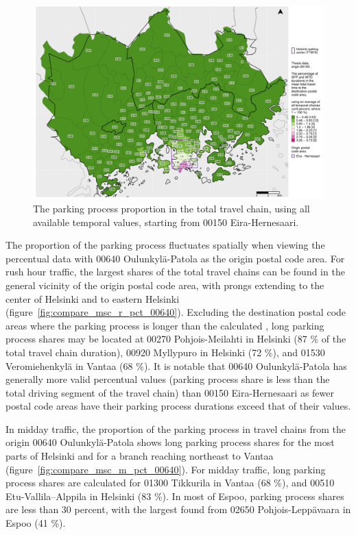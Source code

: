 \begin{figure}[H]%
    \centering
    \includegraphics[trim={0.9cm 0.3cm 0.25cm 0.3cm},clip,width=\textwidth]{images/compare_traveltimes_mapfill-msc_all_pct_fromzip-00150_28-09-2020.png}
    \caption[Parking process proportion from Eira-Hernesaari, all temporal values]{The parking process proportion in the total travel chain, using all available temporal values, starting from 00150 Eira-Hernesaari.}%
    \label{fig:compare_msc_all_pct_00150}%
\end{figure}

The proportion of the parking process fluctuates spatially when viewing the percentual data with 00640 Oulunkylä-Patola as the origin postal code area. For rush hour traffic, the largest shares of the total travel chains can be found in the general vicinity of the origin postal code area, with prongs extending to the center of Helsinki and to eastern Helsinki (figure~\ref{fig:compare_msc_r_pct_00640}). Excluding the destination postal code areas where the parking process is longer than the calculated , long parking process shares may be located at 00270 Pohjois-Meilahti in Helsinki (87 \% of the total travel chain duration), 00920 Myllypuro in Helsinki (72 \%), and 01530 Veromiehenkylä in Vantaa (68 \%). It is notable that 00640 Oulunkylä-Patola has generally more valid percentual values (parking process share is less than the total driving segment of the travel chain) than 00150 Eira-Hernesaari as fewer postal code areas have their parking process durations exceed that of their  values.

In midday traffic, the proportion of the parking process in travel chains from the origin 00640 Oulunkylä-Patola shows long parking process shares for the most parts of Helsinki and for a branch reaching northeast to Vantaa (figure~\ref{fig:compare_msc_m_pct_00640}). For midday traffic, long parking process shares are calculated for 01300 Tikkurila in Vantaa (68 \%), and 00510 Etu-Vallila--Alppila in Helsinki (83 \%). In most of Espoo, parking process shares are less than 30 percent, with the largest found from 02650 Pohjois-Leppävaara in Espoo (41 \%).

